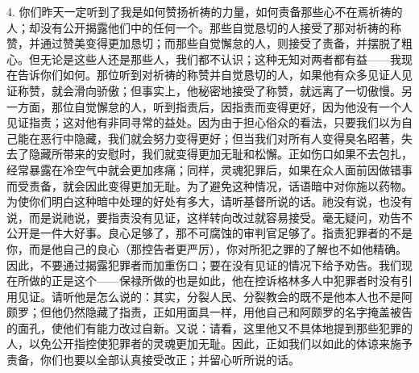 4. 你们昨天一定听到了我是如何赞扬祈祷的力量，如何责备那些心不在焉祈祷的人；却没有公开揭露他们中的任何一个。那些自觉恳切的人接受了那对祈祷的称赞，并通过赞美变得更加恳切；而那些自觉懈怠的人，则接受了责备，并摆脱了粗心。但无论是这些人还是那些人，我们都不认识；这种无知对两者都有益——我现在告诉你们如何。那位听到对祈祷的称赞并自觉恳切的人，如果他有众多见证人见证称赞，就会滑向骄傲；但事实上，他秘密地接受了称赞，就远离了一切傲慢。另一方面，那位自觉懈怠的人，听到指责后，因指责而变得更好，因为他没有一个人见证指责；这对他有非同寻常的益处。因为由于担心俗众的看法，只要我们以为自己能在恶行中隐藏，我们就会努力变得更好；但当我们对所有人变得臭名昭著，失去了隐藏所带来的安慰时，我们就变得更加无耻和松懈。正如伤口如果不去包扎，经常暴露在冷空气中就会更加疼痛；同样，灵魂犯罪后，如果在众人面前因做错事而受责备，就会因此变得更加无耻。为了避免这种情况，话语暗中对你施以药物。为使你们明白这种暗中处理的好处有多大，请听基督所说的话。祂没有说，也没有说，而是说祂说，要指责没有见证，这样转向改过就容易接受。毫无疑问，劝告不公开是一件大好事。良心足够了，那不可腐蚀的审判官足够了。指责犯罪者的不是你，而是他自己的良心（那控告者更严厉），你对所犯之罪的了解也不如他精确。因此，不要通过揭露犯罪者而加重伤口；要在没有见证的情况下给予劝告。我们现在所做的正是这个——保禄所做的也是如此，他在控诉格林多人中犯罪者时没有引用见证。请听他是怎么说的：其实，分裂人民、分裂教会的既不是他本人也不是阿颇罗；但他仍然隐藏了指责，正如用面具一样，用他自己和阿颇罗的名字掩盖被告的面孔，使他们有能力改过自新。又说：请看，这里他又不具体地提到那些犯罪的人，以免公开指控使犯罪者的灵魂更加无耻。因此，正如我们以如此的体谅来施予责备，你们也要以全部认真接受改正；并留心听所说的话。\par

